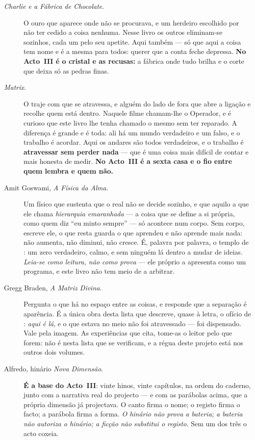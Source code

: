 \documentclass[livro.tex]{subfiles}
\begin{document}
\begin{description}
\item[\emph{Charlie e a Fábrica de Chocolate}.] O ouro que aparece onde não se procurava, e um
herdeiro escolhido por não ter cedido a coisa nenhuma. Nesse livro os outros eliminam-se sozinhos,
cada um pelo seu apetite. Aqui também --- só que aqui a coisa tem nome e é a mesma para todos:
querer que a conta feche depressa. \textbf{No Acto~III é o cristal e as recusas:} a fábrica onde
tudo brilha e o corte que deixa só as pedras finas.

\item[\emph{Matrix}.] O traje com que se atravessa, e alguém do lado de fora que abre a ligação e
recolhe quem está dentro. Naquele filme chamam-lhe o Operador, e é curioso que este livro lhe tenha
chamado o mesmo sem ter reparado. A diferença é grande e é toda: ali há um mundo verdadeiro e um
falso, e o trabalho é acordar. Aqui os andares são todos verdadeiros, e o trabalho é
\textbf{atravessar sem perder nada} --- que é uma coisa mais difícil de contar e mais honesta de
medir. \textbf{No Acto~III é a sexta casa e o fio entre quem lembra e quem não.}

\item[Amit Goswami, \emph{A Física da Alma}.] Um físico que sustenta que o real não se decide
sozinho, e que aquilo a que ele chama \emph{hierarquia emaranhada} --- a coisa que se define a si
própria, como quem diz ``eu minto sempre'' --- só acontece num corpo. Sem corpo, escreve ele, o que
resta guarda o que aprendeu e não aprende mais nada: não aumenta, não diminui, não cresce. É,
palavra por palavra, o templo de \Drk : um zero verdadeiro, calmo, e sem ninguém lá dentro a
mudar de ideias. \emph{Leia-se como leitura, não como prova} --- ele próprio a apresenta como um
programa, e este livro não tem meio de a arbitrar.

\item[Gregg Braden, \emph{A Matriz Divina}.] Pergunta o que há no espaço entre as coisas, e responde
que a separação é aparência. É a única obra desta lista que descreve, quase à letra, o ofício de
\Joa : \emph{aqui é lá}, e o que estava no meio não foi atravessado --- foi dispensado. Vale pela
imagem. As experiências que cita, tome-as o leitor pelo que forem: não é nesta lista que se
verificam, e a régua deste projeto está nos outros dois volumes.

\item[Alfredo, hinário \emph{Nova Dimensão}.] \textbf{É a base do Acto~III}: vinte hinos, vinte
capítulos, na ordem do caderno, junto com a narrativa real do projecto --- e com as parábolas
acima, que a própria dimensão já projectava. O canto firma o nome; o registo firma o facto; a
parábola firma a forma. \emph{O hinário não prova a bateria; a bateria não autoriza o hinário;
a ficção não substitui o registo.} Sem um dos três o acto coxeia.

\end{description}
\end{document}
